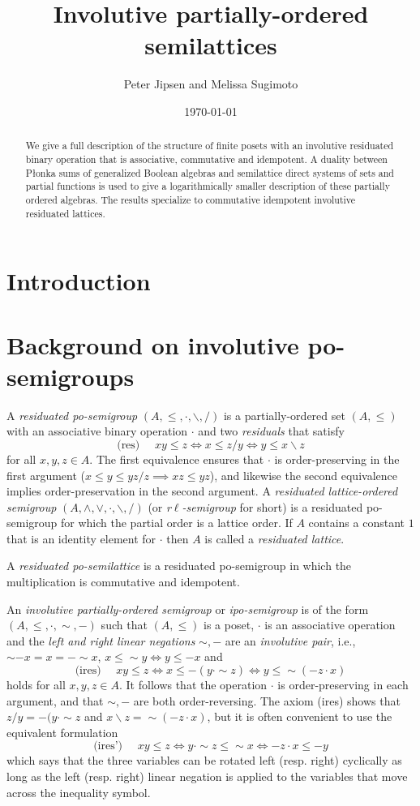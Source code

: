 \documentclass[12pt]{amsart}
\title{Involutive partially-ordered semilattices}
\author{Peter Jipsen and Melissa Sugimoto}
\date{\today}%
\newcommand{\rd}{{/}}
\newcommand{\ld}{{\backslash}}
\renewcommand{\ln}{{\sim}}
\newcommand{\rn}{{-}}
\begin{document}
\begin{abstract}
We give a full description of the structure of finite
posets with an involutive residuated binary operation that is associative, commutative and idempotent.
A duality between P\l onka sums of generalized Boolean algebras
and semilattice direct systems of sets and partial functions
is used to give a logarithmically smaller description of these partially
ordered algebras. The results specialize to commutative idempotent
involutive residuated lattices.
\end{abstract}

\maketitle

\section{Introduction}

\section{Background on involutive po-semigroups}
A \emph{residuated po-semigroup} $(A,\le,\cdot,\ld,\rd)$ is a partially-ordered set $(A,\le)$ with an associative binary operation $\cdot$ and two \emph{residuals} that satisfy
$$
\text{(res) }\quad xy\le z\iff x\le z\rd y\iff y\le x\ld z
$$
for all $x,y,z\in A$.
The first equivalence ensures that $\cdot$ is order-preserving in the first argument ($x\le y\le yz\rd z\implies xz\le yz$), and likewise the second equivalence implies order-preservation in the second argument. A \emph{residuated lattice-ordered semigroup} $(A,\wedge,\vee,\cdot,\ld,\rd)$ (or \emph{r$\ell$-semigroup} for short) is a residuated po-semigroup for which the partial order is
a lattice order. If $A$ contains a constant $1$ that is an identity element for $\cdot$ then $A$ is
called a \emph{residuated lattice}.

A \emph{residuated po-semilattice} is a residuated po-semigroup in which the multiplication is commutative and idempotent.

An \emph{involutive partially-ordered semigroup} or \emph{ipo-semigroup} is of the form $(A,\le,\cdot,\ln,\rn)$ such that $(A,\le)$ is a poset, $\cdot$ is an associative operation and the \emph{left and right linear negations} $\sim,-$ are an \emph{involutive pair}, i.e., $\ln\rn x=x=\rn\ln x$, $x\le \ln y\iff y\le\rn x$ and
$$
\text{(ires) }\quad xy\le z\iff x\le \rn(y\cdot\ln z)\iff y\le \ln(\rn z\cdot x)
$$
holds for all $x,y,z\in A$.
It follows that the operation $\cdot$ is order-preserving in each argument, and that $\ln,\rn$ are both order-reversing. The axiom (ires) shows that $z/y=\rn(y\cdot \ln z$ and $x\ld z=\ln(\rn z\cdot x)$, but it is often convenient to use the equivalent formulation
$$
\text{(ires') }\quad xy\le z\iff y\cdot\ln z\le \ln x\iff \rn z\cdot x\le \rn y
$$
which says that the three variables can be rotated left (resp. right) cyclically as long as the left (resp. right) linear negation is applied to the variables that move across the inequality symbol.
\end{document}
